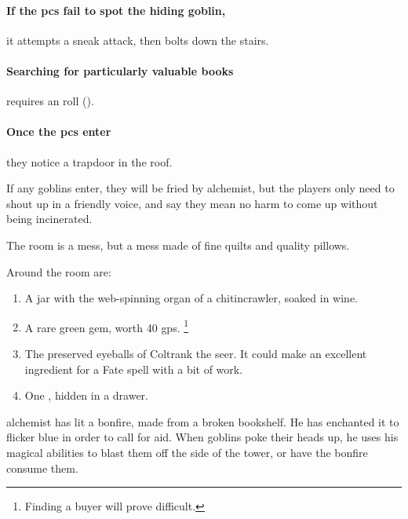 \begin{multicols}{2}

\paragraph{If the \glspl{pc} fail to spot the hiding goblin,}
it attempts a sneak attack, then bolts down the stairs.

\paragraph{Searching for particularly valuable books}
requires an  roll (\tn[12]).

\paragraph{Once the \glspl{pc} enter}
they notice a trapdoor in the roof.

If any goblins enter, they will be fried by \gls{alchemist}, but the players only need to shout up in a friendly voice, and say they mean no harm to come up without being incinerated.


The room is a mess, but a mess made of fine quilts and quality pillows.

Around the room are:

\begin{enumerate}

  \item{A jar with the web-spinning organ of a chitincrawler, soaked in wine.}
  \item{A rare green gem, worth 40 \glspl{gp}.%
  \footnote{Finding a buyer will prove difficult.}}
  \item{The preserved eyeballs of Coltrank the seer.
  It could make an excellent \gls{ingredient} for a Fate spell with a bit of work.}
  \item
  One \lootMagic, hidden in a drawer.

  \showTalisman

\end{enumerate}


\begin{exampletext}
  \Gls{alchemist} has lit a bonfire, made from a broken bookshelf.
  He has enchanted it to flicker blue in order to call for aid.
  When goblins poke their heads up, he uses his magical abilities to blast them off the side of the tower, or have the bonfire consume them.
\end{exampletext}


\end{multicols}
